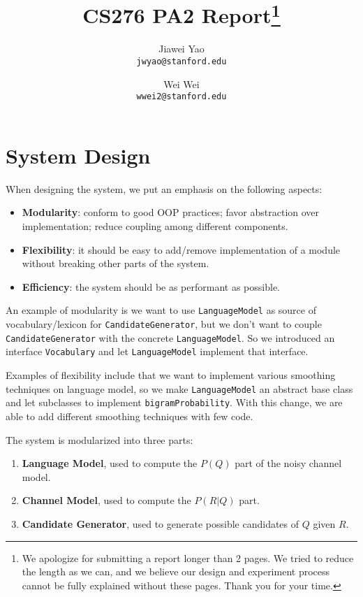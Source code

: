 \documentclass{article}
\begin{document}
\title{CS276 PA2 Report\footnote{We apologize for submitting a report longer than 2 pages. We tried to reduce the length as we can, and we believe our design and experiment process cannot be fully explained without these pages. Thank you for your time.}}

\author{
  Jiawei Yao\\
  \texttt{jwyao@stanford.edu}
  \and
  Wei Wei\\
  \texttt{wwei2@stanford.edu}
}

\maketitle

\section{System Design}

When designing the system, we put an emphasis on the following aspects:

\begin{itemize}
    \item \textbf{Modularity}: conform to good OOP practices; favor abstraction over implementation; reduce coupling among different components.
    \item \textbf{Flexibility}: it should be easy to add/remove implementation of a module without breaking other parts of the system.
    \item \textbf{Efficiency}: the system should be as performant as possible.
\end{itemize}

An example of modularity is we want to use \texttt{LanguageModel} as source of vocabulary/lexicon for \texttt{CandidateGenerator}, but we don't want to couple \texttt{CandidateGenerator} with the concrete \texttt{LanguageModel}. So we introduced an interface \texttt{Vocabulary} and let \texttt{LanguageModel} implement that interface.

Examples of flexibility include that we want to implement various smoothing techniques on language model, so we make \texttt{LanguageModel} an abstract base class and let subclasses to implement \texttt{bigramProbability}. With this change, we are able to add different smoothing techniques with few code.

The system is modularized into three parts:

\begin{enumerate}
    \item \textbf{Language Model}, used to compute the $P(Q)$ part of the noisy channel model.
    \item \textbf{Channel Model}, used to compute the $P(R|Q)$ part.
    \item \textbf{Candidate Generator}, used to generate possible candidates of $Q$ given $R$.
\end{enumerate}
\end{document}
